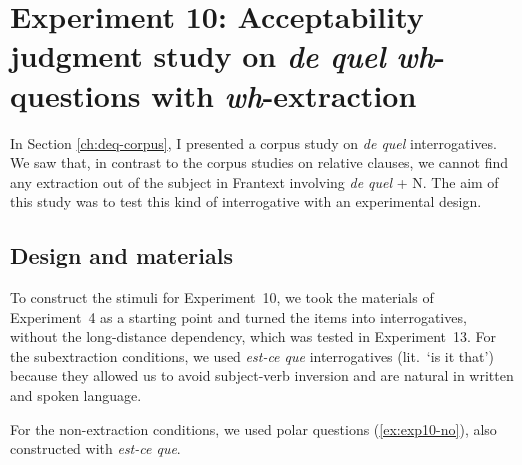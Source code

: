 \section[head=Experiment 10]{Experiment 10: Acceptability judgment study on \emph{de quel} \emph{wh}-questions with \emph{wh}-extraction}

In Section \ref{ch:deq-corpus}, I presented a corpus study on \emph{de quel} interrogatives. We saw that, in contrast to the corpus studies on relative clauses, we cannot find any extraction out of the subject in Frantext involving \emph{de quel} + N. The aim of this study was to test this kind of interrogative with an experimental design.

\subsection{Design and materials}
To construct the stimuli for Experiment~10, we took the materials of Experiment~4 as a starting point and turned the items into interrogatives, without the long-distance dependency, which was tested in Experiment~13. For the subextraction conditions, we used \emph{est-ce que} interrogatives (lit.\ `is it that') because they allowed us to avoid subject-verb inversion and are natural in written and spoken language.

\eal 
{}
\label{ex:exp10-subj-pp}
\label{ex:exp10-obj-pp}
\zl 

For the non-extraction conditions, we used polar questions (\ref{ex:exp10-no}), also constructed with \emph{est-ce que}.\largerpage

